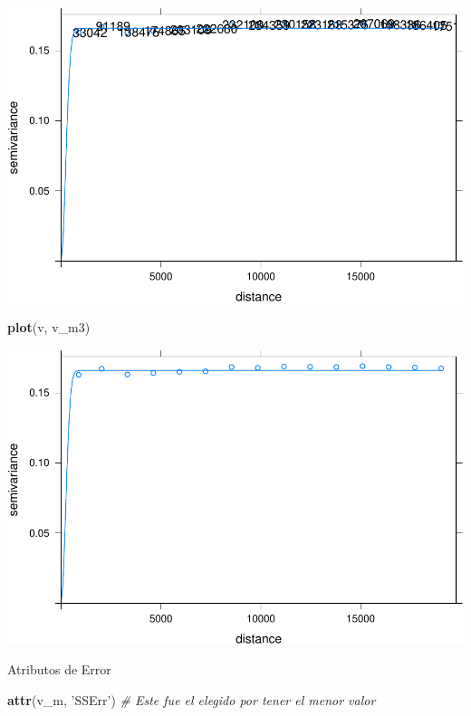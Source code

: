 \documentclass[11pt,]{article}
\newenvironment{Shaded}{\begin{snugshade}}{\end{snugshade}}
\newcommand{\KeywordTok}[1]{\textcolor[rgb]{0.13,0.29,0.53}{\textbf{#1}}}
\newcommand{\StringTok}[1]{\textcolor[rgb]{0.31,0.60,0.02}{#1}}
\newcommand{\CommentTok}[1]{\textcolor[rgb]{0.56,0.35,0.01}{\textit{#1}}}
\newcommand{\NormalTok}[1]{#1}
\begin{document}
\includegraphics{proyecto_f_files/figure-latex/unnamed-chunk-95-1.pdf}

\begin{Shaded}
\begin{Highlighting}[]
\KeywordTok{plot}\NormalTok{(v, v_m3)}
\end{Highlighting}
\end{Shaded}

\includegraphics{proyecto_f_files/figure-latex/unnamed-chunk-95-2.pdf}

Atributos de Error

\begin{Shaded}
\begin{Highlighting}[]
\KeywordTok{attr}\NormalTok{(v_m, }\StringTok{'SSErr'}\NormalTok{) }\CommentTok{# Este fue el elegido por tener el menor valor}
\end{Highlighting}
\end{Shaded}
\end{document}
